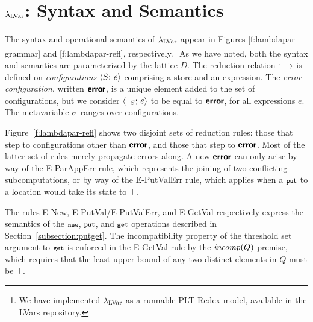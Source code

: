 

\section{$\textup{\ensuremath{\lambda_{\textrm{LVar}}}}$: Syntax and Semantics}\label{section:programming}

The syntax and operational semantics of $\textup{\ensuremath{\lambda_{\textrm{LVar}}}}$ appear in Figures
\ref{f:lambdapar-grammar} and \ref{f:lambdapar-refl}, respectively.\footnote{
We have implemented $\textup{\ensuremath{\lambda_{\textrm{LVar}}}}$
as a runnable PLT Redex \cite{redex-book} model, available
in the LVars repository.}
As we have noted, both the syntax and semantics are
parameterized by the lattice $D$.  The reduction relation $\parstepsto$ is defined
on \emph{configurations} $\langle S;\, e \rangle$ comprising a store and an
expression.  
The \emph{error configuration}, written
$\textbf{\textsf{error}}$,
%
is a unique element added to the set of
  configurations, but 
we consider $\langle \top\hspace{-0.85mm}_{S};\, e \rangle$ to be equal to $\textbf{\textsf{error}}$, for all expressions $e$.
The metavariable $\sigma$ ranges over configurations.

Figure~\ref{f:lambdapar-refl} shows two disjoint sets of reduction
rules: those that step to configurations other than $\textbf{\textsf{error}}$, and
those that step to $\textbf{\textsf{error}}$. Most of the latter set of rules merely propagate errors along.
A new $\textbf{\textsf{error}}$ can only
arise by way of the {\sc E-ParAppErr} rule, which represents the joining of two
conflicting subcomputations, or by way of the {\sc E-PutValErr} rule,
which applies when a $\mbox{\footnotesize \texttt{put}}$ to a location would take 
its state to $\top$. 

The rules {\sc E-New}, {\sc E-PutVal}/{\sc E-PutValErr}, and {\sc E-GetVal} respectively express the semantics of
the $\mbox{\footnotesize \texttt{new}}$, $\mbox{\footnotesize \texttt{put}}$, and $\mbox{\footnotesize \texttt{get}}$ operations described in
Section~\ref{subsection:putget}.  
The incompatibility property of the threshold set argument to $\mbox{\footnotesize \texttt{get}}$ 
is enforced in the {\sc E-GetVal} rule by the $\mathit{incomp}(Q)$ premise,
which requires that the
least upper bound of any two distinct elements in $Q$ must be
$\top$.


